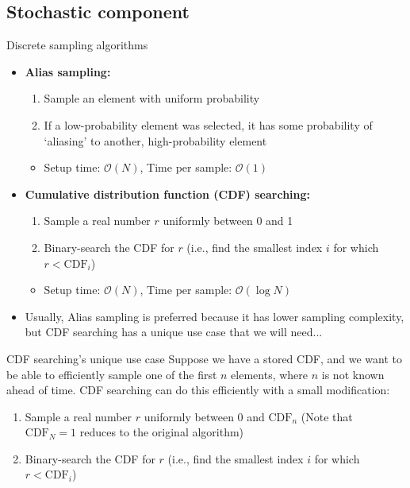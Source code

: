 \documentclass[amsmath]{beamer}
\begin{document}
\subsection{Stochastic component}
\begin{frame}{Discrete sampling algorithms}
	\begin{itemize}
		\item \textbf{Alias sampling:}
		\begin{enumerate}
			\item Sample an element with uniform probability
			\item If a low-probability element was selected, it has some probability of `aliasing' to another, high-probability element
		\end{enumerate}
	    \begin{itemize}
	    	\item Setup time: $\mathcal{O}(N)$, Time per sample: $\mathcal{O}(1)$
    	\end{itemize}
		\item \textbf{Cumulative distribution function (CDF) searching:}
		\begin{enumerate}
			\item Sample a real number $r$ uniformly between 0 and 1
			\item Binary-search the CDF for $r$ (i.e., find the smallest index $i$ for which $r<\textrm{CDF}_i$)
		\end{enumerate}	
		\begin{itemize}
			\item Setup time: $\mathcal{O}(N)$, Time per sample: $\mathcal{O}(\log N)$
		\end{itemize}
		\item Usually, Alias sampling is preferred because it has lower sampling complexity, but CDF searching has a unique use case that we will need...
	\end{itemize}
\end{frame}

\begin{frame}{CDF searching's unique use case}
	Suppose we have a stored CDF, and we want to be able to efficiently sample one of the first $n$ elements, where $n$ is not known ahead of time. CDF searching can do this efficiently with a small modification:
	\begin{enumerate}
		\item Sample a real number $r$ uniformly between 0 and $\textrm{CDF}_n$ (Note that $\textrm{CDF}_N=1$ reduces to the original algorithm)
		\item Binary-search the CDF for $r$ (i.e., find the smallest index $i$ for which $r<\textrm{CDF}_i$)
	\end{enumerate}
\end{frame}
\end{document}
